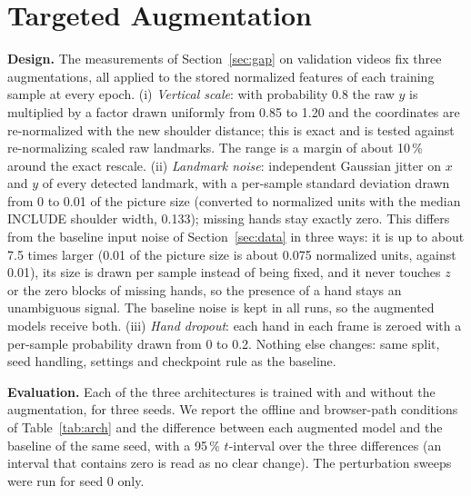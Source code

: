 \documentclass[conference]{IEEEtran}
\begin{document}
\section{Targeted Augmentation}\label{sec:aug}
\textbf{Design.} The measurements of Section~\ref{sec:gap} on validation videos fix three augmentations, all applied to the stored normalized features of each training sample at every epoch. (i) \emph{Vertical scale}: with probability 0.8 the raw $y$ is multiplied by a factor drawn uniformly from 0.85 to 1.20 and the coordinates are re-normalized with the new shoulder distance; this is exact and is tested against re-normalizing scaled raw landmarks. The range is a margin of about 10\,\% around the exact rescale. (ii) \emph{Landmark noise}: independent Gaussian jitter on $x$ and $y$ of every detected landmark, with a per-sample standard deviation drawn from 0 to 0.01 of the picture size (converted to normalized units with the median INCLUDE shoulder width, 0.133); missing hands stay exactly zero. This differs from the baseline input noise of Section~\ref{sec:data} in three ways: it is up to about 7.5 times larger (0.01 of the picture size is about 0.075 normalized units, against 0.01), its size is drawn per sample instead of being fixed, and it never touches $z$ or the zero blocks of missing hands, so the presence of a hand stays an unambiguous signal. The baseline noise is kept in all runs, so the augmented models receive both. (iii) \emph{Hand dropout}: each hand in each frame is zeroed with a per-sample probability drawn from 0 to 0.2. Nothing else changes: same split, seed handling, settings and checkpoint rule as the baseline.

\textbf{Evaluation.} Each of the three architectures is trained with and without the augmentation, for three seeds. We report the offline and browser-path conditions of Table~\ref{tab:arch} and the difference between each augmented model and the baseline of the same seed, with a 95\,\% $t$-interval over the three differences (an interval that contains zero is read as no clear change). The perturbation sweeps were run for seed 0 only.
\end{document}
